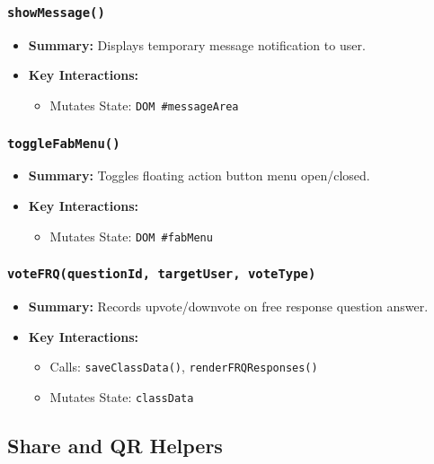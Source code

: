 \documentclass[11pt,letterpaper]{article}
\begin{document}
\subsubsection{\texttt{showMessage()}}
\begin{itemize}
    \item \textbf{Summary:} Displays temporary message notification to user.
    \item \textbf{Key Interactions:}
    \begin{itemize}
        \item Mutates State: \texttt{DOM \#messageArea}
    \end{itemize}
\end{itemize}

\subsubsection{\texttt{toggleFabMenu()}}
\begin{itemize}
    \item \textbf{Summary:} Toggles floating action button menu open/closed.
    \item \textbf{Key Interactions:}
    \begin{itemize}
        \item Mutates State: \texttt{DOM \#fabMenu}
    \end{itemize}
\end{itemize}

\subsubsection{\texttt{voteFRQ(questionId, targetUser, voteType)}}
\begin{itemize}
    \item \textbf{Summary:} Records upvote/downvote on free response question answer.
    \item \textbf{Key Interactions:}
    \begin{itemize}
        \item Calls: \texttt{saveClassData()}, \texttt{renderFRQResponses()}
        \item Mutates State: \texttt{classData}
    \end{itemize}
\end{itemize}

\subsection{Share and QR Helpers}
\end{document}
